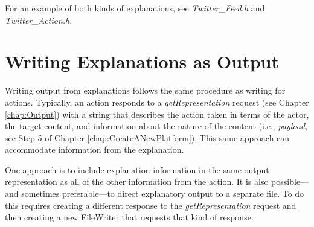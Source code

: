 For an example of both kinds of explanations, see \textit{Twitter\_Feed.h} and \textit{Twitter\_Action.h}.
  
 \section{Writing Explanations as Output}
Writing output from explanations follows the same procedure as writing for actions. Typically, an action responds to a \textit{getRepresentation} request (see Chapter \ref{chap:Output}) with a string that describes the action taken in terms of the actor, the target content, and information about the nature of the content (i.e., \textit{payload}, see Step 5 of Chapter \ref{chap:CreateANewPlatform}). This same approach can accommodate information from the explanation.

One approach is to include explanation information in the same output representation as all of the other information from the action. It is also possible---and sometimes preferable---to direct explanatory output to a separate file. To do this requires creating a different response to the \textit{getRepresentation} request and then creating a new FileWriter that requests that kind of response.


